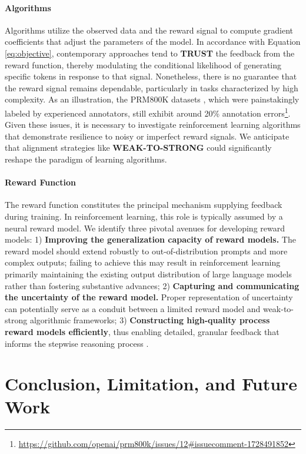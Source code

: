 \paragraph{Algorithms} Algorithms utilize the observed data and the reward signal to compute gradient coefficients that adjust the parameters of the model. In accordance with Equation \ref{eq:objective}, contemporary approaches tend to \textbf{TRUST} the feedback from the reward function, thereby modulating the conditional likelihood of generating specific tokens in response to that signal. Nonetheless, there is no guarantee that the reward signal remains dependable, particularly in tasks characterized by high complexity. As an illustration, the PRM800K datasets \citep{lightman2023let}, which were painstakingly labeled by experienced annotators, still exhibit around 20\% annotation errors\footnote{\url{https://github.com/openai/prm800k/issues/12\#issuecomment-1728491852}}. Given these issues, it is necessary to investigate reinforcement learning algorithms that demonstrate resilience to noisy or imperfect reward signals. We anticipate that alignment strategies like \textbf{WEAK-TO-STRONG} \citep{burns2023weak} could significantly reshape the paradigm of learning algorithms.

\paragraph{Reward Function} The reward function constitutes the principal mechanism supplying feedback during training. In reinforcement learning, this role is typically assumed by a neural reward model. We identify three pivotal avenues for developing reward models: 1) \textbf{Improving the generalization capacity of reward models.} The reward model should extend robustly to out-of-distribution prompts and more complex outputs; failing to achieve this may result in reinforcement learning primarily maintaining the existing output distribution of large language models rather than fostering substantive advances; 2) \textbf{Capturing and communicating the uncertainty of the reward model.} Proper representation of uncertainty can potentially serve as a conduit between a limited reward model and weak-to-strong algorithmic frameworks; 3) \textbf{Constructing high-quality process reward models efficiently}, thus enabling detailed, granular feedback that informs the stepwise reasoning process \citep{lightman2023let,wang2023math}.

\section{Conclusion, Limitation, and Future Work} 

